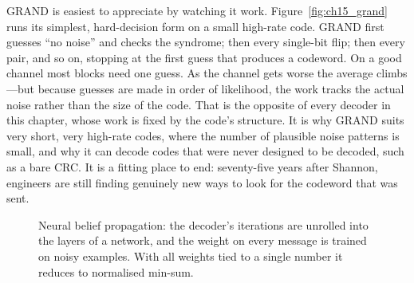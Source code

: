 GRAND is easiest to appreciate by watching it work. Figure~\ref{fig:ch15_grand} runs its simplest,
hard-decision form on a small high-rate code. GRAND first guesses ``no noise'' and checks the
syndrome; then every single-bit flip; then every pair, and so on, stopping at the first guess that
produces a codeword. On a good channel most blocks need one guess. As the channel gets worse the
average climbs---but because guesses are made in order of likelihood, the work tracks the actual
noise rather than the size of the code. That is the opposite of every decoder in this chapter,
whose work is fixed by the code's structure. It is why GRAND suits very short, very high-rate codes,
where the number of plausible noise patterns is small, and why it can decode codes that were never
designed to be decoded, such as a bare CRC. It is a fitting place to end: seventy-five years after
Shannon, engineers are still finding genuinely new ways to look for the codeword that was sent.

\begin{figure}[htbp]\centering
{}
\caption{Neural belief propagation: the decoder's iterations are unrolled into the layers of a
network, and the weight on every message is trained on noisy examples. With all weights tied to a
single number it reduces to normalised min-sum.}
\label{fig:ch15_neuralbp}
\end{figure}

